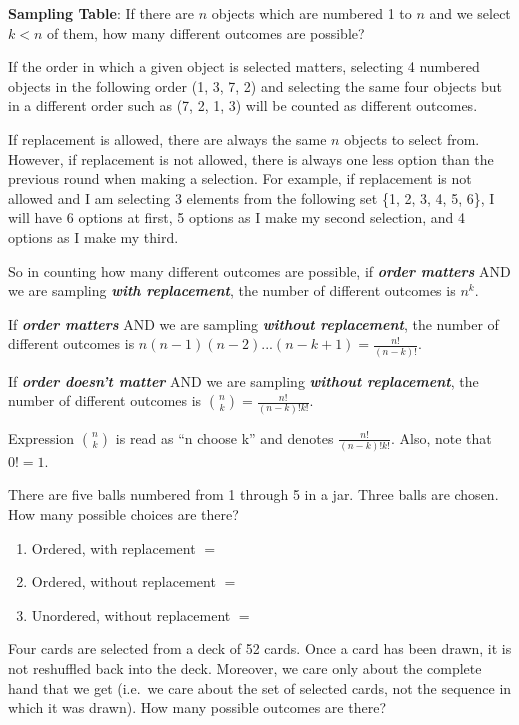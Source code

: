 \documentclass[]{book}
\theoremstyle{definition}
\theoremstyle{definition}
\theoremstyle{definition}
\theoremstyle{remark}
\let\BeginKnitrBlock\begin \let\EndKnitrBlock\end
\begin{document}
\textbf{Sampling Table}: If there are \(n\) objects which are numbered 1 to \(n\) and we select \(k < n\) of them, how many different outcomes are possible?

If the order in which a given object is selected matters, selecting 4 numbered objects in the following order (1, 3, 7, 2) and selecting the same four objects but in a different order such as (7, 2, 1, 3) will be counted as different outcomes.

If replacement is allowed, there are always the same \(n\) objects to select from. However, if replacement is not allowed, there is always one less option than the previous round when making a selection. For example, if replacement is not allowed and I am selecting 3 elements from the following set \{1, 2, 3, 4, 5, 6\}, I will have 6 options at first, 5 options as I make my second selection, and 4 options as I make my third.

So in counting how many different outcomes are possible, if \textbf{\emph{order matters}} AND we are sampling \textbf{\emph{with replacement}}, the number of different outcomes is \(n^k\).

If \textbf{\emph{order matters}} AND we are sampling \textbf{\emph{without replacement}}, the number of different outcomes is \(n(n-1)(n-2)...(n-k+1)=\frac{n!}{(n-k)!}\).

If \textbf{\emph{order doesn't matter}} AND we are sampling \textbf{\emph{without replacement}}, the number of different outcomes is \(\binom{n}{k} = \frac{n!}{(n-k)!k!}\).

Expression \(\binom{n}{k}\) is read as ``n choose k'' and denotes \(\frac{n!}{(n-k)!k!}\). Also, note that \(0! = 1\).

\BeginKnitrBlock{example}[Counting]
\protect\hypertarget{exm:counting}{}{\label{exm:counting} {} }
There are five balls numbered from 1 through 5 in a jar. Three balls are chosen. How many possible choices are there?

\begin{enumerate}
\def\labelenumi{\arabic{enumi}.}
\item
  Ordered, with replacement \(=\)
\item
  Ordered, without replacement \(=\)
\item
  Unordered, without replacement \(=\)
\end{enumerate}
\EndKnitrBlock{example}

\BeginKnitrBlock{exercise}[Counting]
\protect\hypertarget{exr:counting1}{}{\label{exr:counting1} {} }
Four cards are selected from a deck of 52 cards. Once a card has been drawn, it is not reshuffled back into the deck. Moreover, we care only about the complete hand that we get (i.e.~we care about the set of selected cards, not the sequence in which it was drawn). How many possible outcomes are there?
\EndKnitrBlock{exercise}
\end{document}
